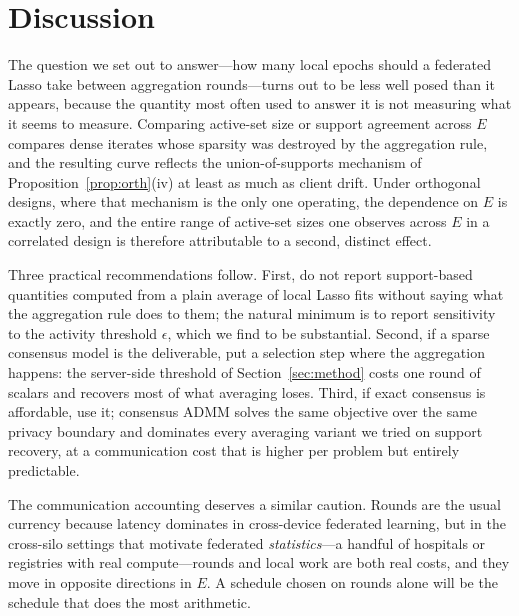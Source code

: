 \section{Discussion}
\label{sec:discussion}

The question we set out to answer---how many local epochs should a
federated Lasso take between aggregation rounds---turns out to be less
well posed than it appears, because the quantity most often used to answer
it is not measuring what it seems to measure. Comparing active-set size or
support agreement across $E$ compares dense iterates whose sparsity was
destroyed by the aggregation rule, and the resulting curve reflects the
union-of-supports mechanism of Proposition~\ref{prop:orth}(iv) at least as
much as client drift. Under orthogonal designs, where that mechanism is the
only one operating, the dependence on $E$ is exactly zero, and the entire
range of active-set sizes one observes across $E$ in a correlated design is
therefore attributable to a second, distinct effect.

Three practical recommendations follow. First, do not report support-based
quantities computed from a plain average of local Lasso fits without saying
what the aggregation rule does to them; the natural minimum is to report
sensitivity to the activity threshold $\epsilon$, which we find to be
substantial. Second, if a sparse consensus model is the deliverable, put a
selection step where the aggregation happens: the server-side threshold of
Section~\ref{sec:method} costs one round of scalars and recovers most of
what averaging loses. Third, if exact consensus is affordable, use it;
consensus ADMM solves the same objective over the same privacy boundary and
dominates every averaging variant we tried on support recovery, at a
communication cost that is higher per problem but entirely predictable.

The communication accounting deserves a similar caution. Rounds are the
usual currency because latency dominates in cross-device federated
learning, but in the cross-silo settings that motivate federated
\emph{statistics}---a handful of hospitals or registries with real
compute---rounds and local work are both real costs, and they move in
opposite directions in $E$. A schedule chosen on rounds alone will be the
schedule that does the most arithmetic.

